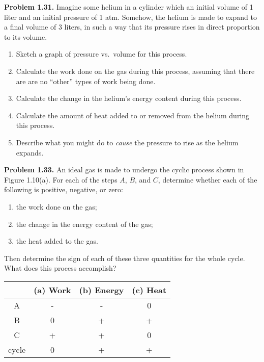 \documentclass[a4paper, 12pt]{config/homework}
\begin{document}
\bigskip\noindent


\bigskip\noindent \textbf{Problem 1.31.} Imagine some helium in a cylinder which an initial volume of 1 liter and an initial pressure of 1 atm. Somehow, the helium is made to expand to a final volume of 3 liters, in such a way that its pressure rises in direct proportion to its volume.
\begin{enumerate}[label=\textbf{(\alph*)}]
\item Sketch a graph of pressure vs.\ volume for this process.
\item Calculate the work done on the gas during this process, assuming that there are are no ``other'' types of work being done.
\item Calculate the change in the helium's energy content during this process.
\item Calculate the amount of heat added to or removed from the helium during this process.
\item Describe what you might do to \textit{cause} the pressure to rise as the helium expands.
\end{enumerate}

\bigskip\noindent


\pagebreak\noindent
\textbf{Problem 1.33.} An ideal gas is made to undergo the cyclic process shown in Figure 1.10(a). For each of the steps \(A\), \(B\), and \(C\), determine whether each of the following is positive, negative, or zero:
\begin{enumerate}[label=(\alph*)]
\item the work done on the gas;
\item the change in the energy content of the gas;
\item the heat added to the gas.
\end{enumerate}
Then determine the sign of each of these three quantities for the whole cycle. What does this process accomplish?

\bigskip\noindent
\begin{center}
\begin{tabular}{c|c|c|c}
& (a) Work & (b) Energy & (c) Heat \\ \hline \hline
A & - & - & 0 \\ \hline
B & 0 & + & + \\ \hline
C & + & + & 0 \\ \hline \hline
cycle & 0 & + & + \\ \hline
\end{tabular}
\end{center}
\end{document}
